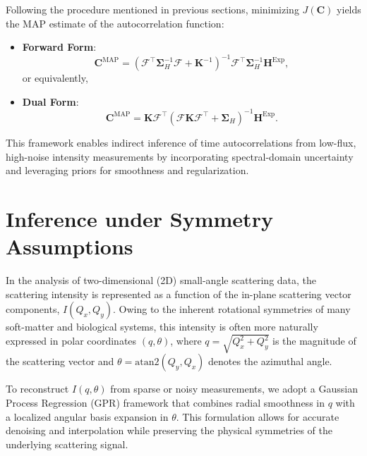 \documentclass[12pt]{article}
\begin{document}
Following the procedure mentioned in previous sections, minimizing \( J(\mathbf{C}) \) yields the MAP estimate of the autocorrelation function:
\begin{itemize}
    \item \textbf{Forward Form}:
    \begin{equation}
        \mathbf{C}^{\mathrm{MAP}} = \left( \mathcal{F}^\top \boldsymbol{\Sigma}_H^{-1} \mathcal{F} + \mathbf{K}^{-1} \right)^{-1} \mathcal{F}^\top \boldsymbol{\Sigma}_H^{-1} \mathbf{H}^{\mathrm{Exp}},
    \end{equation}
    or equivalently,
    \item \textbf{Dual Form}:
    \begin{equation}
        \mathbf{C}^{\mathrm{MAP}} = \mathbf{K} \mathcal{F}^\top \left( \mathcal{F} \mathbf{K} \mathcal{F}^\top + \boldsymbol{\Sigma}_H \right)^{-1} \mathbf{H}^{\mathrm{Exp}}.
    \end{equation}
\end{itemize}

This framework enables indirect inference of time autocorrelations from low-flux, high-noise intensity measurements by incorporating spectral-domain uncertainty and leveraging priors for smoothness and regularization.

\section{Inference under Symmetry Assumptions}
In the analysis of two-dimensional (2D) small-angle scattering data, the scattering intensity is represented as a function of the in-plane scattering vector components, \( I(Q_x, Q_y) \). Owing to the inherent rotational symmetries of many soft-matter and biological systems, this intensity is often more naturally expressed in polar coordinates \( (q, \theta) \), where \( q = \sqrt{Q_x^2 + Q_y^2} \) is the magnitude of the scattering vector and \( \theta = \mathrm{atan2}(Q_y, Q_x) \) denotes the azimuthal angle.

To reconstruct \( I(q, \theta) \) from sparse or noisy measurements, we adopt a Gaussian Process Regression (GPR) framework that combines radial smoothness in \( q \) with a localized angular basis expansion in \( \theta \). This formulation allows for accurate denoising and interpolation while preserving the physical symmetries of the underlying scattering signal.

\end{document}
